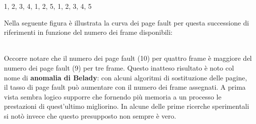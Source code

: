 \documentclass{article}
\begin{document}
				\begin{center}
					1, 2, 3, 4, 1, 2, 5, 1, 2, 3, 4, 5
				\end{center}
				Nella seguente figura è illustrata la curva dei page fault per questa successione di riferimenti in funzione del numero dei frame disponibili:
				\begin{figure}[ht!]
				\end{figure}
				\\Occorre notare che il numero dei page fault (10) per quattro frame è maggiore del numero dei page fault (9) per tre frame. Questo inatteso risultato è noto col nome di \textbf{anomalia di Belady}: con alcuni algoritmi di sostituzione delle pagine, il tasso di page fault può aumentare con il numero dei frame assegnati. A prima vista sembra logico supporre che fornendo più memoria a un processo le prestazioni di quest’ultimo migliorino. In alcune delle prime ricerche sperimentali si notò invece che questo presupposto non sempre è vero.
\end{document}
